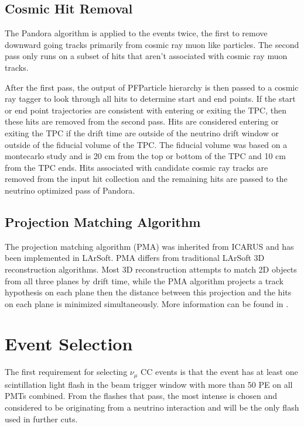 \subsection{Cosmic Hit Removal}
The Pandora algorithm is applied to the events twice, the first to remove downward going tracks primarily from cosmic ray muon like particles. The second pass only runs on a subset of hits that aren't associated with cosmic ray muon tracks. 

After the first pass, the output of PFParticle hierarchy is then passed to a cosmic ray tagger to look through all hits to determine start and end points. If the start or end point trajectories are consistent with entering or exiting the TPC, then these hits are removed from the second pass. Hits are considered entering or exiting the TPC if the drift time are outside of the neutrino drift window or outside of the fiducial volume of the TPC. The fiducial volume was based on a montecarlo study and is 20 cm from the top or bottom of the TPC and 10 cm from the TPC ends. Hits associated with candidate cosmic  ray tracks are removed from the input hit collection and the remaining hits are passed to the neutrino optimized pass of Pandora.


\subsection{Projection Matching Algorithm}
The projection matching algorithm (PMA) was inherited from ICARUS and has been implemented in LArSoft. PMA differs from traditional LArSoft 3D reconstruction algorithms. Most 3D reconstruction attempts to match 2D objects from all three planes by drift time, while the PMA algorithm projects a track hypothesis on each plane then the distance between this projection and the hits on each plane is minimized simultaneously. More information can be found in \cite{PMA}.
\section{Event Selection}\label{section:eventselection}
The first requirement for selecting $\nu_{\mu}$ CC events is that the event has at least one scintillation light flash in the beam trigger window with more than 50 PE on all PMTs combined. From the flashes that pass, the most intense is chosen and considered to be originating from a neutrino interaction and will be the only flash used in further cuts. 

